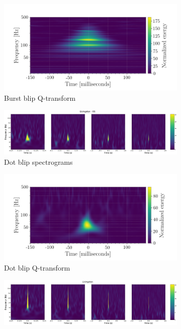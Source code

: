 \documentclass[a4paper]{article}
\begin{document}
\begin{figure}
\begin{subfigure}[t]{.7\textwidth}
	\end{subfigure}
	\begin{subfigure}[t]{.29\textwidth}
		\centering
		\includegraphics[width=1.1\linewidth]{burst_blip}
		\caption{Burst blip Q-transform}
		\label{fig:burst_q}
	\end{subfigure}
	\begin{subfigure}[t]{.7\textwidth}
		\centering
		\includegraphics[width=.9\linewidth]{dot_blip_spect}
		\caption{Dot blip spectrograms}
		\label{fig:dot_s}
	\end{subfigure}
	\begin{subfigure}[t]{.29\textwidth}
		\centering
		\includegraphics[width=1.1\linewidth]{dot_blip}
		\caption{Dot blip Q-transform}
		\label{fig:dot_q}
	\end{subfigure}
	\begin{subfigure}[t]{.7\textwidth}
		\centering
		\includegraphics[width=.9\linewidth]{stick_blip_spect}

\end{subfigure}
\end{figure}
\end{document}
